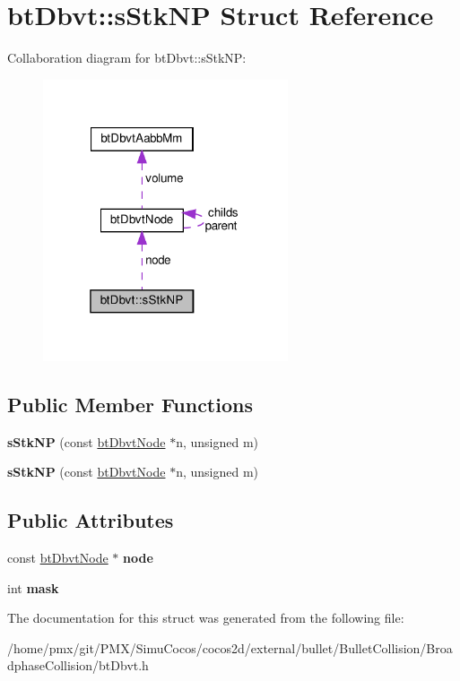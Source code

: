 \hypertarget{structbtDbvt_1_1sStkNP}{}\section{bt\+Dbvt\+:\+:s\+Stk\+NP Struct Reference}
\label{structbtDbvt_1_1sStkNP}


Collaboration diagram for bt\+Dbvt\+:\+:s\+Stk\+NP\+:
\nopagebreak
\begin{figure}[H]
\begin{center}
\leavevmode
\includegraphics[width=205pt]{structbtDbvt_1_1sStkNP__coll__graph}
\end{center}
\end{figure}
\subsection*{Public Member Functions}
\begin{DoxyCompactItemize}
\item 
\mbox{\label{structbtDbvt_1_1sStkNP_a779083781a038c4765d2380803386742}} 
{\bfseries s\+Stk\+NP} (const \hyperlink{structbtDbvtNode}{bt\+Dbvt\+Node} $\ast$n, unsigned m)
\item 
\mbox{\label{structbtDbvt_1_1sStkNP_a779083781a038c4765d2380803386742}} 
{\bfseries s\+Stk\+NP} (const \hyperlink{structbtDbvtNode}{bt\+Dbvt\+Node} $\ast$n, unsigned m)
\end{DoxyCompactItemize}
\subsection*{Public Attributes}
\begin{DoxyCompactItemize}
\item 
\mbox{\label{structbtDbvt_1_1sStkNP_a66dc32ee0da36eb725dcd2f2fe276207}} 
const \hyperlink{structbtDbvtNode}{bt\+Dbvt\+Node} $\ast$ {\bfseries node}
\item 
\mbox{\label{structbtDbvt_1_1sStkNP_ae1c9afcd5531c3868cf22724da51341f}} 
int {\bfseries mask}
\end{DoxyCompactItemize}


The documentation for this struct was generated from the following file\+:\begin{DoxyCompactItemize}
\item 
/home/pmx/git/\+P\+M\+X/\+Simu\+Cocos/cocos2d/external/bullet/\+Bullet\+Collision/\+Broadphase\+Collision/bt\+Dbvt.\+h\end{DoxyCompactItemize}
